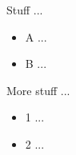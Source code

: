Stuff ...

\begin{itemize}
  \item A ...
  \item B ...
\end{itemize}

More stuff ...

\begin{itemize}
  \item 1 ...
  \item 2 ...
\end{itemize}

\lipsum[1-6]
